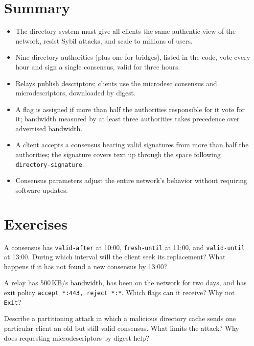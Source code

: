 \section*{Summary}
\begin{itemize}
  \item The directory system must give all clients the same authentic view of the network, resist Sybil attacks, and scale to millions of users.
  \item Nine directory authorities (plus one for bridges), listed in the code, vote every hour and sign a single consensus, valid for three hours.
  \item Relays publish descriptors; clients use the microdesc consensus and microdescriptors, downloaded by digest.
  \item A flag is assigned if more than half the authorities responsible for it vote for it; bandwidth measured by at least three authorities takes precedence over advertised bandwidth.
  \item A client accepts a consensus bearing valid signatures from more than half the authorities; the signature covers text up through the space following \texttt{directory-signature}.
  \item Consensus parameters adjust the entire network's behavior without requiring software updates.
\end{itemize}

\section*{Exercises}

\begin{esercizio}[1]\label{es:12-validita}
A consensus has \texttt{valid-after} at 10:00, \texttt{fresh-until} at 11:00, and \texttt{valid-until} at 13:00. During which interval will the client seek its replacement? What happens if it has not found a new consensus by 13:00?
\end{esercizio}

\begin{esercizio}[1]\label{es:12-flag}
A relay has 500\,KB/s bandwidth, has been on the network for two days, and has exit policy \texttt{accept *:443, reject *:*}. Which flags can it receive? Why not \texttt{Exit}?
\end{esercizio}

\begin{esercizio}[2]\label{es:12-partizione}
Describe a partitioning attack in which a malicious directory cache sends one particular client an old but still valid consensus. What limits the attack? Why does requesting microdescriptors by digest help?
\end{esercizio}

